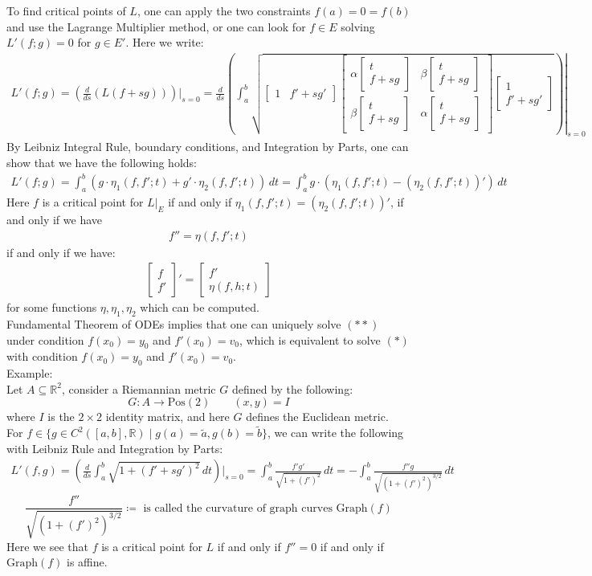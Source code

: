\documentclass[11pt,oneside]{book}
\theoremstyle{break}
\theoremstyle{break}
\newcommand{\R}{\mathbb{R}}
\newcommand{\that}[1]{\widetilde{#1}}
\newcommand{\bmat}[1]{\begin{bmatrix} #1 \end{bmatrix}}
\newcommand{\example}{\color{green}Example: \color{black}}
\begin{document}
To find critical points of $L$, one can apply the two constraints $f(a) = 0 = f(b)$ and use the Lagrange Multiplier method, or one can look for $f \in E$ solving $L'(f;g) = 0$ for $g \in E'$. Here we write:
\begin{align*}
L'(f;g) = \left(\frac{d}{ds} \left(L (f+sg)\right)\right)|_{s= 0} = 
\left.\frac{d}{ds} \left(\int_a^b \sqrt{\bmat{1 & f'+sg'}\bmat{\alpha\bmat{t \\ f+sg}&\beta\bmat{t \\ f+sg}\\\beta\bmat{t \\ f+sg}&\alpha\bmat{t \\ f+sg}}\bmat{1 \\ f'+sg'}} \right)\right|_{s= 0}
 \end{align*}
By Leibniz Integral Rule, boundary conditions, and Integration by Parts, one can show that we have the following holds:
\begin{align*}
L'(f;g) = \int_a^b \left(g\cdot \eta_1(f,f';t) + g'\cdot \eta_2(f,f';t)\right) \, dt = \int_a^b g\cdot \left(\eta_1(f,f';t) - (\eta_2(f,f';t))'\right) \, dt
\end{align*}
Here $f$ is a critical point for $L|_E$ if and only if $\eta_1(f,f';t) = (\eta_2(f,f';t))'$, if and only if we have
\begin{align*}
f'' = \eta(f,f';t) \tag{*}
\end{align*} 
if and only if we have:
\begin{align*}
\bmat{f \\ f'}' = \bmat{f' \\ \eta(f,h;t) }\tag{**}
\end{align*}
for some functions $\eta,\eta_1,\eta_2$ which can be computed. \\


Fundamental Theorem of ODEs implies that one can uniquely solve $(**)$ under condition $f(x_0) = y_0$ and $f'(x_0) = v_0$, which is equivalent to solve $(*)$ with condition $f(x_0) = y_0$ and $f'(x_0) = v_0$.\\

\example\\
Let $A \subseteq \R^2$, consider a Riemannian metric $G$ defined by the following: 
$$G:A \to \text{Pos}(2) \qquad (x,y)  = I$$ 
where $I$ is the $2\times 2$ identity matrix, and here $G$ defines the Euclidean metric. \\
For $f \in \{ g\in C^2([a,b], \R)\mid g(a) = \that{a}, g(b) = \that{b}\}$, we can write the following with Leibniz Rule and Integration by Parts:
\begin{align*}
L'(f,g) =\left( \frac{d}{ds} \int_a^b \sqrt{1 + (f'+sg')^2}\, dt \right)|_{s= 0} = \int_a^b \frac{f'g'}{\sqrt{1+(f')^2}}\, dt = -\int_a^b \frac{f'' g}{\sqrt{(1+(f')^2)^{3/2}}}\, dt
\end{align*}
$$\frac{f''}{\sqrt{(1+(f')^2)^{3/2}}} \coloneqq \text{ is called the curvature of graph curves }\text{Graph}(f)$$
Here we see that $f$ is a critical point for $L$ if and only if $f'' = 0$ if and only if $\text{Graph}(f)$ is affine. \\
\end{document}
